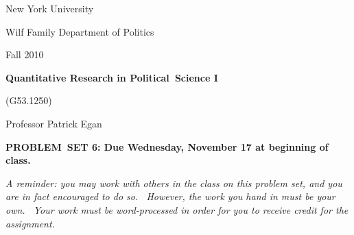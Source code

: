 \documentclass[11pt]{article}
\begin{document}
New York University

Wilf Family Department of Politics

Fall 2010

\begin{center}
{\large \textbf{Quantitative Research in Political\ Science I}}

(G53.1250)

Professor Patrick Egan

\bigskip

\textbf{PROBLEM\ SET 6: Due Wednesday, November 17 at beginning of class.}
\end{center}

\textit{A reminder: you may work with others in the class on this problem
set, and you are in fact encouraged to do so. \ However, the work you hand
in must be your own. \ Your work must be word-processed in order for you to
receive credit for the assignment.}

\bigskip
\end{document}
